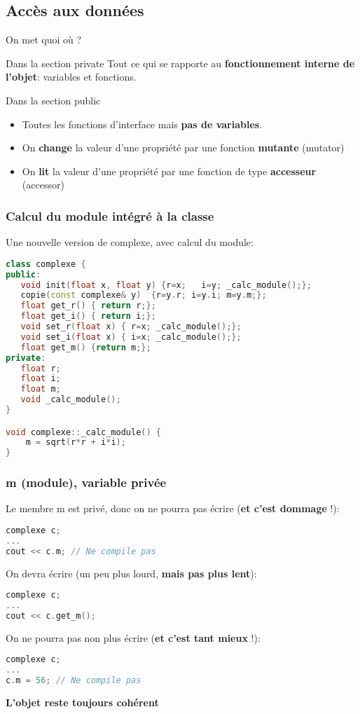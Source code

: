 \documentclass{beamer}
\begin{document}
\subsection{Accès aux données}

\begin{frame}{On met quoi où ?}
\begin{block}{Dans la section private}
Tout ce qui se rapporte au \textbf{fonctionnement interne de l'objet}: variables et fonctions.
\end{block}
\begin{block}{Dans la section public}
\begin{itemize}
\item{Toutes les fonctions d'interface mais \textbf{pas de variables}. }
\item{On \textbf{change} la valeur d'une propriété par une fonction \textbf{mutante} (mutator)}
\item{On \textbf{lit} la valeur d'une propriété par une fonction de type \textbf{accesseur} (accessor)}
\end{itemize}
\end{block}
\end{frame}

\begin{frame}[fragile=singleslide,shrink=20]
\frametitle {Calcul du module intégré à la classe}
Une nouvelle version de complexe, avec calcul du module:
\begin{lstlisting}[language=c++]
class complexe {
public:
   void init(float x, float y) {r=x;   i=y; _calc_module();};
   copie(const complexe& y)  {r=y.r; i=y.i; m=y.m;};
   float get_r() { return r;};
   float get_i() { return i;};
   void set_r(float x) { r=x; _calc_module();};
   void set_i(float x) { i=x; _calc_module();};
   float get_m() {return m;};
private:
   float r;
   float i;
   float m;
   void _calc_module();
}

void complexe::_calc_module() {
    m = sqrt(r*r + i*i);
}
\end{lstlisting}
\end{frame}

\begin{frame}[fragile=singleslide,shrink=20]
\frametitle {m (module), variable privée}
Le membre m est privé, donc on ne pourra pas écrire (\textbf{et c'est dommage} !):
\begin{lstlisting}[language=c++]
complexe c;
...
cout << c.m; // Ne compile pas
\end{lstlisting}

On devra écrire (un peu plus lourd, \textbf{mais pas plus lent}):
\begin{lstlisting}[language=c++]
complexe c;
...
cout << c.get_m();
\end{lstlisting}

On ne pourra pas non plus écrire (\textbf{et c'est tant mieux} !):
\begin{lstlisting}[language=c++]
complexe c;
...
c.m = 56; // Ne compile pas
\end{lstlisting}

\textbf{L'objet reste toujours cohérent}

\end{frame}
\end{document}
